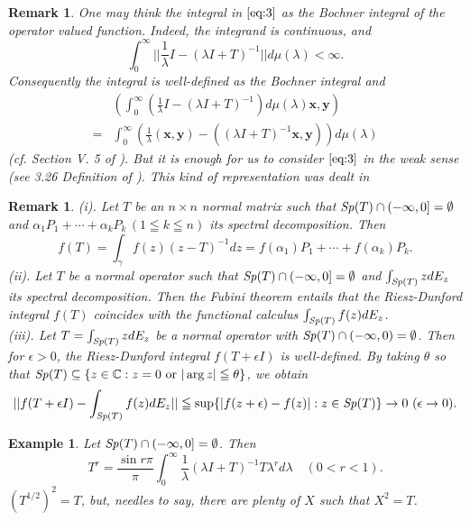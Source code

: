 \documentclass[10pt,a4paper]{amsart}
\newtheorem{example}[theorem]{Example}
\newtheorem{remark}[theorem]{Remark}
\begin{document}
\begin{remark}\label{Re:2-1}\rm
One may think the integral in $\eqref{eq:3}$ as the Bochner integral of the operator valued 
function. Indeed, the integrand is continuous, and 
$$\int_0^{\infty} ||\frac{1}{\lambda} I - (\lambda I  + T)^{-1}|| d\mu(\lambda)
<\infty.$$
Consequently the integral is well-defined as the Bochner integral and 
\begin{align*}
&\left(\int_0^{\infty} (\frac{1}{\lambda} I - (\lambda I  + T)^{-1}) d\mu(\lambda)
\mathbf{x}, \mathbf{y}\right)\\
 =& \int_0^{\infty} \left(\frac{1}{\lambda}(\mathbf{x}, \mathbf{y}) - 
((\lambda I  + T)^{-1}\mathbf{x}, \mathbf{y})\right)  d\mu(\lambda)
\end{align*}
(cf. Section V. 5 of \cite{Y}). 
But it is enough for us to consider $\eqref{eq:3}$ in the weak sense (see 3.26 Definition of \cite{Rudin}). 
This kind of representation was dealt in \cite{Sano}
\end{remark}
\begin{remark}\label{Re:2-2}\rm
(i). Let $T$ be an $n\times n$ normal matrix such that ${\it Sp}(T) \cap (-\infty, 0] = \emptyset$ and $\alpha_1 P_1 + \cdots + \alpha_k P_k  
\, (1\leqq k \leqq n)$ its spectral decomposition. Then  
$$f(T)= \int_{\gamma} f(z) (z-T)^{-1} dz =  f(\alpha_1) P_1 + \cdots + 
f(\alpha_k) P_k.$$
(ii). Let $T$ be a normal operator such that ${\it Sp}(T) \cap (-\infty, 0] = \emptyset$ and 
$\int_{{\it Sp}(T)} z d E_z$ its spectral decomposition. Then the Fubini 
theorem entails that the Riesz-Dunford integral $f(T)$ coincides with the functional calculus 
$\int_{{\it Sp}(T)} f(z) d E_z$.\\
(iii). 
Let $T= \int_{{\it Sp}(T)} z dE_z$ be a normal operator with ${\it Sp}(T) \cap (-\infty, 0) = \emptyset$. Then for $\epsilon>0$, the Riesz-Dunford integral $f(T+ \epsilon I)$ is well-defined. 
By taking $\theta$ so that  
${\it Sp}(T) \subseteq \{ z \in \mathbb{C}: z=0\,\, \text{or}\,\, |\arg z| \leqq \theta \}$, we obtain 
$$||f(T+ \epsilon I) - \int_{{\it Sp}(T)} f(z) dE_z|| \leqq 
 \sup \{|f(z+ \epsilon) - f(z)|: z \in {\it Sp}(T)\} \to 0 \,\, (\epsilon \to 0).$$
\end{remark}

\begin{example}\label{Ex:2-1}
Let ${\it Sp}(T) \cap (-\infty, 0] = \emptyset$. Then 
\begin{equation}
T^r= \frac{\sin r \pi}{\pi} \int_0^{\infty} 
 \frac{1}{\lambda} (\lambda I + T)^{-1}T\lambda ^r d\lambda \quad (0<r<1). \label{eq:4}
\end{equation}
$(T^{1/2})^2 = T$, but, needles to say, there are plenty of $X$ such that $X^2=T$. 
\end{example}
\end{document}
